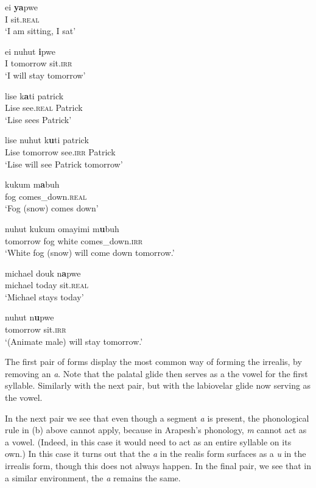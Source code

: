 \documentclass[pdftex,12pt,letterpaper]{article}
\let\ipa\textipa
\def\sw{\ipa{\super w}}
\begin{document}
 \begin{exe}
 \ex
 \gll ei \textbf{ya}pwe \\
 I sit.\textsc{real} \\
 \trans `I am sitting, I sat'

 \ex
 \gll ei nuhut \textbf{i}pwe \\
 I tomorrow sit.\textsc{irr} \\
 \trans `I will stay tomorrow'

 \ex
 \gll lise k\textbf{\sw a}ti patrick \\
 Lise see.\textsc{real} Patrick \\
 \trans `Lise sees Patrick'

 \ex
 \gll lise nuhut k\textbf{u}ti patrick \\
 Lise tomorrow see.\textsc{irr} Patrick \\
 \trans `Lise will see Patrick tomorrow'

 \ex
 \gll kukum m\textbf{a}buh \\
 fog comes\_down.\textsc{real} \\
 \trans `Fog (snow) comes down'

 \ex
 \gll nuhut kukum omayimi m\textbf{u}buh \\
 tomorrow fog white comes\_down.\textsc{irr} \\
 \trans `White fog (snow) will come down tomorrow.'

 \ex
 \gll michael douk n\textbf{a}pwe \\
 michael today sit.\textsc{real} \\
 \trans `Michael stays today'

 \ex
 \gll nuhut n\textbf{u}pwe \\
 tomorrow sit.\textsc{irr} \\
 \trans `(Animate male) will stay tomorrow.'
 \end{exe}

 \noindent The first pair of forms display the most common way of forming the irrealis, by removing an \emph{a}. Note that the palatal glide then serves as a the vowel for the first syllable. Similarly with the next pair, but with the labiovelar glide now serving as the vowel.

 In the next pair we see that even though a segment \emph{a} is present, the phonological rule in (b) above cannot apply, because in Arapesh's phonology, \emph{m} cannot act as a vowel. (Indeed, in this case it would need to act as an entire syllable on its own.) In this case it turns out that the \emph{a} in the realis form surfaces as a \emph{u} in the irrealis form, though this does not always happen. In the final pair, we see that in a similar environment, the \emph{a} remains the same.
\end{document}
